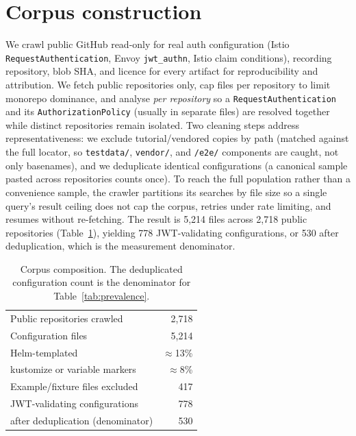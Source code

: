 \section{Corpus construction}\label{sec:corpus}
We crawl public GitHub read-only for real auth configuration (Istio
\texttt{RequestAuthentication}, Envoy \texttt{jwt\_authn}, Istio claim conditions),
recording repository, blob SHA, and licence for every artifact for reproducibility
and attribution. We fetch public repositories only, cap files per repository to
limit monorepo dominance, and analyse \emph{per repository} so a
\texttt{RequestAuthentication} and its \texttt{AuthorizationPolicy} (usually in
separate files) are resolved together while distinct repositories remain isolated.
Two cleaning steps address representativeness: we exclude tutorial/vendored copies
by path (matched against the full locator, so \texttt{testdata/}, \texttt{vendor/},
and \texttt{/e2e/} components are caught, not only basenames), and we deduplicate
identical configurations (a canonical sample pasted across repositories counts
once). To reach the full population rather than a convenience sample, the crawler
partitions its searches by file size so a single query's result ceiling does not cap
the corpus, retries under rate limiting, and resumes without re-fetching. The result
is 5{,}214 files across 2{,}718 public repositories (Table~\ref{tab:corpus}),
yielding 778 JWT-validating configurations, or 530 after deduplication, which is the
measurement denominator. 

\begin{table}[t]
\centering\small
\caption{Corpus composition. The deduplicated configuration count is the
denominator for Table~\ref{tab:prevalence}.}
\label{tab:corpus}
\begin{tabular}{@{}lr@{}}
\toprule
Public repositories crawled & 2{,}718 \\
Configuration files & 5{,}214 \\
\quad Helm-templated & $\approx$13\% \\
\quad kustomize or variable markers & $\approx$8\% \\
Example/fixture files excluded & 417 \\
JWT-validating configurations & 778 \\
\quad after deduplication (denominator) & 530 \\
\bottomrule
\end{tabular}
\end{table}

